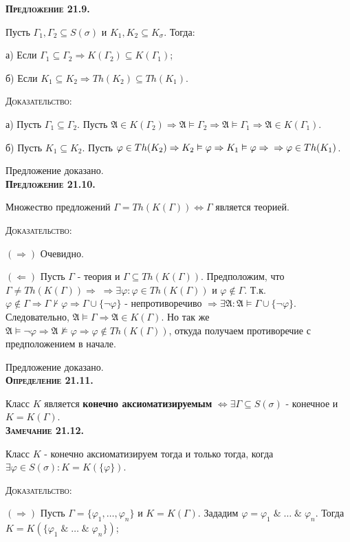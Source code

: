 \documentclass[18pt, a4paper]{extarticle}
\newcommand{\opred}[1]{\textbf{\textsc{Определение #1}}}
\newcommand{\predl}[1]{\textbf{\textsc{Предложение #1}}}
\newcommand{\zam}[1]{\textbf{\textsc{Замечание #1}}}
\newcommand{\lot}[3]{#1_#2,\dots,#1_#3}
\newcommand{\ampersand}{\;\&\;}
\newcommand{\Gm}{\Gamma}
\newcommand{\vp}{\varphi}
\newcommand{\vD}{\vDash}
\newcommand{\sg}{\sigma}
\newcommand{\rightdok}{\boxed{(\Rightarrow)}}
\newcommand{\leftdok}{\boxed{(\Leftarrow)}}
\newcommand{\mA}{\mathfrak{A}}
\newcommand{\dok}{\textsc{Доказательство:}}
\begin{document}
\predl {21.9.}

Пусть $\Gm_1,\Gm_2\subseteq S(\sg)$ и $K_1,K_2\subseteq K_\sg$. Тогда:

а) Если $\Gm_1\subseteq\Gm_2\Rightarrow K(\Gm_2)\subseteq K(\Gm_1)$;

б) Если $K_1\subseteq K_2\Rightarrow Th(K_2)\subseteq Th(K_1)$.

\dok

а) Пусть $\Gm_1\subseteq\Gm_2$. Пусть $\mA\in K(\Gm_2)\Rightarrow\mA\vD\Gm_2\Rightarrow\mA\vD\Gm_1\Rightarrow\mA\in K(\Gm_1)$.

б) Пусть $K_1\subseteq K_2$. Пусть $\vp\in Th(K_2)\Rightarrow K_2\vD\vp\Rightarrow K_1\vD\vp\Rightarrow\newline \Rightarrow\vp\in Th(K_1)$.

Предложение доказано.\\

\predl {21.10.}

Множество предложений $\Gm=Th(K(\Gm))\Leftrightarrow\Gm$ является теорией.

\dok

$\rightdok$ Очевидно.

$\leftdok$ Пусть $\Gm$ - теория и $\Gm\subseteq Th(K(\Gm))$. Предположим, что $\Gm\neq Th(K(\Gm))\Rightarrow\;\Rightarrow\exists\vp\!\!:\vp\in Th(K(\Gm))$ и $\vp\notin\Gm$. Т.к. $\vp\notin\Gm\Rightarrow\Gm\nvdash\vp\Rightarrow\Gm\cup\{\lnot\vp\}$ - непротиворечиво $\Rightarrow\exists\mA\!\!:\mA\vD\Gm\cup\{\lnot\vp\}$. Следовательно, $\mA\vD\Gm\Rightarrow\mA\in K(\Gm)$. Но так же $\mA\vD\lnot\vp\Rightarrow\mA\nvDash\vp\Rightarrow\vp\notin Th(K(\Gm))$, откуда получаем противоречие с предположением в начале. 

Предложение доказано.\\

\opred {21.11.}

Класс $K$ является \textbf{конечно аксиоматизируемым} $\Leftrightarrow\exists\Gm\subseteq S(\sg)$ - конечное и $K=K(\Gm)$.\\

\zam {21.12.}

Класс $K$ - конечно аксиоматизируем тогда и только тогда, когда\\$\exists\vp\in S(\sg)\!: K=K(\{\vp\})$. 

\dok

$\rightdok$ Пусть $\Gm=\{\lot \vp 1 n\}$ и $K=K(\Gm)$. Зададим $\vp=\vp_1\ampersand\dots\ampersand\vp_n$. Тогда $K=K(\{\vp_1\ampersand\dots\ampersand\vp_n\})$;
\end{document}

